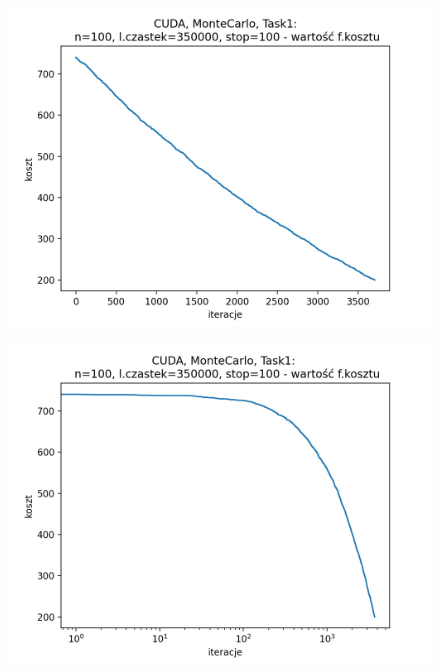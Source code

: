 \documentclass[11pt, a4paper, oneside]{article}
\begin{document}
\begin{figure}[H]
\centering
\begin{minipage}[b]{\dimexpr.5\textwidth-1em}
  \centering
  \includegraphics[width=1\linewidth]{grafiki2/CUDA/CUDA_MonteCarlo_Task1_koszt_linear.png}
  \label{fig:koszt:PMC1CUDA}
\end{minipage} \hfill
\begin{minipage}[b]{\dimexpr.5\textwidth-1em}
  \centering
  \includegraphics[width=1\linewidth]{grafiki2/CUDA/CUDA_MonteCarlo_Task1_koszt_log.png}
  \label{fig:koszt:MC1CUDAlog}
\end{minipage}
\end{figure}
\end{document}
